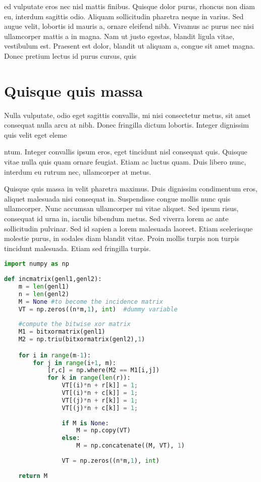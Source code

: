 \documentclass[12pt]{article} %
\begin{document}
{\sffamily ed vulputate eros nec nisl mattis finibus. Quisque dolor purus, rhoncus non diam eu,
interdum sagittis odio. Aliquam sollicitudin pharetra neque in varius. Sed augue velit, lobortis id
mauris a, ornare eleifend nibh. Vivamus ac purus nec nisi ullamcorper mattis a in magna. Nam ut justo
egestas, blandit ligula vitae, vestibulum est. Praesent est dolor, blandit ut aliquam a, congue sit
amet magna. Donec pretium lectus id purus cursus, quis}

\section{Quisque quis massa}

Nulla vulputate, odio eget sagittis convallis, mi nisi consectetur metus, sit amet consequat nulla
arcu at nibh. Donec fringilla dictum lobortis. Integer dignissim quis velit eget eleme

ntum. Integer convallis ipsum eros, eget tincidunt nisl consequat quis. Quisque vitae nulla quis quam
ornare feugiat. Etiam ac luctus quam. Duis libero nunc, interdum eu rutrum nec, ullamcorper at metus.

Quisque quis massa in velit pharetra maximus. Duis dignissim condimentum eros, aliquet malesuada nisi
consequat in. Suspendisse congue mollis nunc quis ullamcorper. Nunc accumsan ullamcorper mi vitae
aliquet. Sed ipsum risus, consequat id urna in, iaculis bibendum metus. Sed viverra lorem ac ante
sollicitudin pulvinar. Sed id sapien a lorem malesuada laoreet. Etiam scelerisque molestie purus, in
sodales diam blandit vitae. Proin mollis turpis non turpis tincidunt malesuada. Etiam sed fringilla
turpis.

\begin{lstlisting}[language=Python, caption=Python example]
import numpy as np
    
def incmatrix(genl1,genl2):
    m = len(genl1)
    n = len(genl2)
    M = None #to become the incidence matrix
    VT = np.zeros((n*m,1), int)  #dummy variable
    
    #compute the bitwise xor matrix
    M1 = bitxormatrix(genl1)
    M2 = np.triu(bitxormatrix(genl2),1) 

    for i in range(m-1):
        for j in range(i+1, m):
            [r,c] = np.where(M2 == M1[i,j])
            for k in range(len(r)):
                VT[(i)*n + r[k]] = 1;
                VT[(i)*n + c[k]] = 1;
                VT[(j)*n + r[k]] = 1;
                VT[(j)*n + c[k]] = 1;
                
                if M is None:
                    M = np.copy(VT)
                else:
                    M = np.concatenate((M, VT), 1)
                
                VT = np.zeros((n*m,1), int)
    
    return M
\end{lstlisting}
\end{document}

